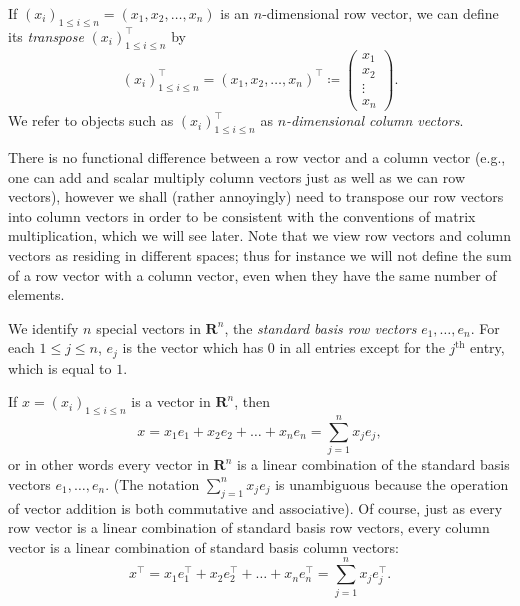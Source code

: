 \begin{definition}[Transpose]\label{6.1.3}
    If \((x_i)_{1 \leq i \leq n} = (x_1, x_2, \dots, x_n)\) is an \(n\)-dimensional row vector, we can define its \emph{transpose} \((x_i)_{1 \leq i \leq n}^\top\) by
    \[
        (x_i)_{1 \leq i \leq n}^\top = (x_1, x_2, \dots, x_n)^\top \coloneqq \begin{pmatrix}
            x_1    \\
            x_2    \\
            \vdots \\
            x_n
        \end{pmatrix}.
    \]
    We refer to objects such as \((x_i)_{1 \leq i \leq n}^\top\) as \emph{\(n\)-dimensional column vectors}.
\end{definition}

\begin{remark}\label{6.1.4}
    There is no functional difference between a row vector and a column vector (e.g., one can add and scalar multiply column vectors just as well as we can row vectors), however we shall (rather annoyingly) need to transpose our row vectors into column vectors in order to be consistent with the conventions of matrix multiplication, which we will see later.
    Note that we view row vectors and column vectors as residing in different spaces;
    thus for instance we will not define the sum of a row vector with a column vector, even when they have the same number of elements.
\end{remark}

\begin{definition}\label{6.1.5}
    We identify \(n\) special vectors in \(\mathbf{R}^n\), the \emph{standard basis row vectors} \(e_1, \dots, e_n\).
    For each \(1 \leq j \leq n\), \(e_j\) is the vector which has \(0\) in all entries except for the \(j^{\text{th}}\) entry, which is equal to \(1\).
\end{definition}

\begin{note}
    If \(x = (x_i)_{1 \leq i \leq n}\) is a vector in \(\mathbf{R}^n\), then
    \[
        x = x_1 e_1 + x_2 e_2 + \dots + x_n e_n = \sum_{j = 1}^n x_j e_j,
    \]
    or in other words every vector in \(\mathbf{R}^n\) is a linear combination of the standard basis vectors \(e_1, \dots, e_n\).
    (The notation \(\sum_{j = 1}^n x_j e_j\) is unambiguous because the operation of vector addition is both commutative and associative).
    Of course, just as every row vector is a linear combination of standard basis row vectors, every column vector is a linear combination of standard basis column vectors:
    \[
        x^\top = x_1 e_1^\top + x_2 e_2^\top + \dots + x_n e_n^\top = \sum_{j = 1}^n x_j e_j^\top.
    \]
\end{note}

